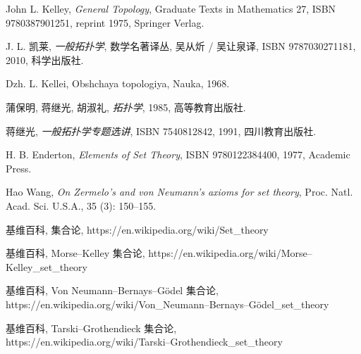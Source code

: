 \documentclass[zihao=-4,a4paper]{ctexart}
\begin{document}
\begin{thebibliography}{9}

John L. Kelley,  \emph{General Topology}, Graduate Texts in Mathematics 27, ISBN 9780387901251, reprint 1975, Springer Verlag.
	
J. L. 凯莱,  \emph{一般拓扑学}, 数学名著译丛, 吴从炘 / 吴让泉译, ISBN 9787030271181, 2010, 科学出版社.

{\selectfont  D{zh}. L. Kellei, Ob{shch}a{ya} topologi{ya}, Nauka,} 1968.


蒲保明, 蒋继光, 胡淑礼, \emph{拓扑学}, 1985, 高等教育出版社.

蒋继光, \emph{一般拓扑学专题选讲}, ISBN 7540812842, 1991, 四川教育出版社.
	
H. B. Enderton, \emph{Elements of Set Theory}, ISBN 9780122384400, 1977, Academic Press.
	
Hao Wang, \emph{On Zermelo's and von Neumann's axioms for set theory}, Proc. Natl. Acad. Sci. U.S.A., 35 (3): 150–155.

基维百科, 集合论,	https://en.wikipedia.org/wiki/Set\_theory

基维百科, Morse–Kelley 集合论,	https://en.wikipedia.org/wiki/Morse–Kelley\_set\_theory

基维百科, Von Neumann–Bernays–Gödel  集合论,\\ https://en.wikipedia.org/wiki/Von\_Neumann–Bernays–Gödel\_set\_theory

基维百科, Tarski–Grothendieck  集合论,\\
https://en.wikipedia.org/wiki/Tarski–Grothendieck\_set\_theory

\end{thebibliography}
\end{document}
